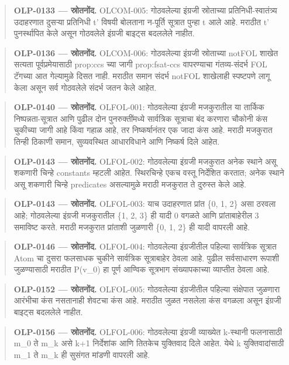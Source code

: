 \begin{quote}\small\textbf{OLP-0133 — स्रोतनोंद.} OLCOM-005: गोठवलेल्या इंग्रजी स्रोताच्या प्रतिनिधी-स्वातंत्र्य उदाहरणात दुसऱ्या प्रतिनिधी t' विषयी बोलताना न-पूर्ति सूत्रात पुन्हा t आले आहे. मराठीत t' पुनर्स्थापित केले असून गोठवलेले इंग्रजी बाइट्स बदललेले नाहीत.\end{quote}
\begin{quote}\small\textbf{OLP-0136 — स्रोतनोंद.} OLCOM-006: गोठवलेल्या इंग्रजी स्रोताच्या notFOL शाखेत सत्यता पूर्वप्रमेयासाठी prop:ccs च्या जागी prop:fsat-ccs वापरण्याचा गंतव्य-संदर्भ FOL टॅगच्या आत गेल्यामुळे दिसत नाही. मराठीत समान संदर्भ notFOL शाखेलाही स्पष्टपणे लागू केला असून सर्व गोठवलेले संदर्भ जतन केले आहेत.\end{quote}
\begin{quote}\small\textbf{OLP-0140 — स्रोतनोंद.} OLFOL-001: गोठवलेल्या इंग्रजी मजकुरातील या तार्किक निष्पन्नता-सूत्रात आणि पुढील दोन पुनरुक्तींमध्ये सार्वत्रिक सूत्राचा बंद करणारा चौकोनी कंस चुकीच्या जागी आहे किंवा गहाळ आहे, तर निष्कर्षानंतर एक जादा कंस आहे. मराठी मजकुरात तिन्ही ठिकाणी समान, सुव्यवस्थित आधारविधाने आणि निष्कर्ष दिले आहेत.\end{quote}
\begin{quote}\small\textbf{OLP-0143 — स्रोतनोंद.} OLFOL-002: गोठवलेल्या इंग्रजी मजकुरात अनेक स्थाने असू शकणारी चिन्हे constants म्हटली आहेत. स्थिरचिन्हे एकच वस्तू निर्देशित करतात; अनेक स्थाने असू शकणारी चिन्हे predicates असल्यामुळे मराठी मजकुरात ते दुरुस्त केले आहे.\end{quote}
\begin{quote}\small\textbf{OLP-0143 — स्रोतनोंद.} OLFOL-003: याच उदाहरणात प्रांत \{0, 1, 2\} असा ठरवला आहे; गोठवलेल्या इंग्रजी मजकुरातील \{1, 2, 3\} ही यादी 0 वगळते आणि प्रांताबाहेरील 3 समाविष्ट करते. मराठी मजकुरात प्रांताशी जुळणारी \{0, 1, 2\} ही यादी वापरली आहे.\end{quote}
\begin{quote}\small\textbf{OLP-0146 — स्रोतनोंद.} OLFOL-004: गोठवलेल्या इंग्रजीतील पहिल्या सार्वत्रिक सूत्रात Atom चा दुसरा फलसाधक चुकीने सार्वत्रिक सूत्राबाहेर ठेवला आहे. पुढील सर्वसाधारण रूपाशी जुळण्यासाठी मराठीत P(v\_0) हा पूर्ण आण्विक सूत्रभाग संख्यापकाच्या व्याप्तीत ठेवला आहे.\end{quote}
\begin{quote}\small\textbf{OLP-0152 — स्रोतनोंद.} OLFOL-005: गोठवलेल्या इंग्रजीतील पहिल्या संक्षेपात जुळणारा आरंभीचा कंस नसतानाही शेवटचा कंस आहे. मराठीत जुळत नसलेला कंस वगळला असून इंग्रजी बाइट्स बदललेले नाहीत.\end{quote}
\begin{quote}\small\textbf{OLP-0156 — स्रोतनोंद.} OLFOL-006: गोठवलेल्या इंग्रजी व्याख्येत k-स्थानी फलनासाठी m\_0 ते m\_k असे k+1 निर्देशांक आणि तितकेच युक्तिवाद दिले आहेत. येथे k युक्तिवादांसाठी m\_1 ते m\_k ही सुसंगत मांडणी वापरली आहे.\end{quote}
